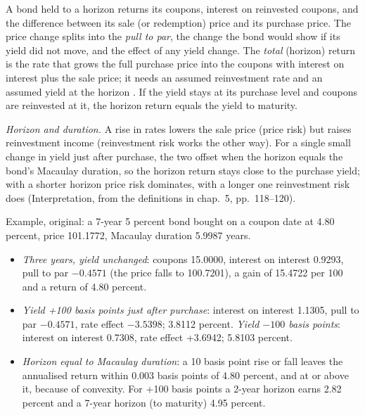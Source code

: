 \begin{qfmethod}\label{meth:bond-return-decomposition}
 A bond held to a horizon returns its coupons, interest on reinvested coupons, and the difference between its sale (or redemption) price and its purchase price. The price change splits into the \emph{pull to par}, the change the bond would show if its yield did not move, and the effect of any yield change. The \emph{total} (horizon) return is the rate that grows the full purchase price into the coupons with interest on interest plus the sale price; it needs an assumed reinvestment rate and an assumed yield at the horizon \citep[chap.~4, pp.~76--79 and~87--90]{s7-fabozzifixed}. If the yield stays at its purchase level and coupons are reinvested at it, the horizon return equals the yield to maturity.

\emph{Horizon and duration.} A rise in rates lowers the sale price (price risk) but raises reinvestment income (reinvestment risk works the other way). For a single small change in yield just after purchase, the two offset when the horizon equals the bond's Macaulay duration, so the horizon return stays close to the purchase yield; with a shorter horizon price risk dominates, with a longer one reinvestment risk does (Interpretation, from the definitions in chap.~5, pp.~118--120).

 Example, original: a 7-year 5 percent bond bought on a coupon date at 4.80 percent, price 101.1772, Macaulay duration 5.9987 years.
\begin{itemize}
\item \emph{Three years, yield unchanged}: coupons 15.0000, interest on interest 0.9293, pull to par $-0.4571$ (the price falls to 100.7201), a gain of 15.4722 per 100 and a return of 4.80 percent.
\item \emph{Yield +100 basis points just after purchase}: interest on interest 1.1305, pull to par $-0.4571$, rate effect $-3.5398$; 3.8112 percent. \emph{Yield $-100$ basis points}: interest on interest 0.7308, rate effect +3.6942; 5.8103 percent.
\item \emph{Horizon equal to Macaulay duration}: a 10 basis point rise or fall leaves the annualised return within 0.003 basis points of 4.80 percent, and at or above it, because of convexity. For +100 basis points a 2-year horizon earns 2.82 percent and a 7-year horizon (to maturity) 4.95 percent.
\end{itemize}


\end{qfmethod}
